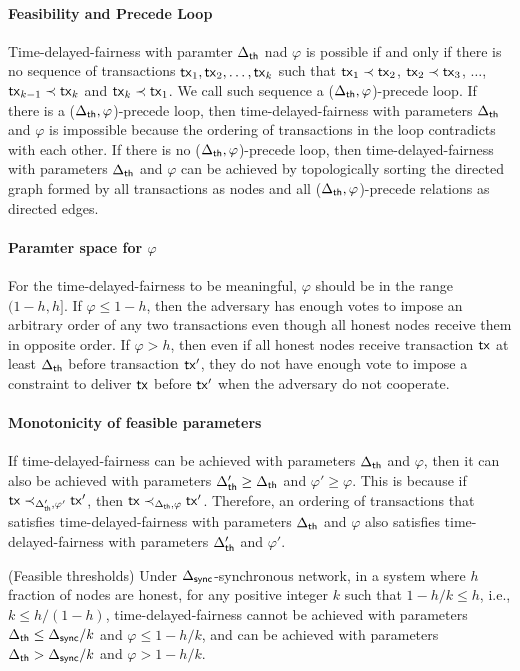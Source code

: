 \paragraph{Feasibility and Precede Loop} Time-delayed-fairness with paramter $\Delta_{\mathsf{th}}$ nad $\varphi$ is possible if and only if there is no sequence of transactions $\mathsf{tx}_1, \mathsf{tx}_2, \ldots, \mathsf{tx}_k$ such that $\mathsf{tx}_1\prec \mathsf{tx}_2$, $\mathsf{tx}_2\prec \mathsf{tx}_3$, $\ldots$, $\mathsf{tx}_{k-1}\prec \mathsf{tx}_k$ and $\mathsf{tx}_k\prec \mathsf{tx}_1$. We call such sequence a ($\Delta_{\mathsf{th}}, \varphi$)-precede loop. If there is a ($\Delta_{\mathsf{th}}, \varphi$)-precede loop, then time-delayed-fairness with parameters $\Delta_{\mathsf{th}}$ and $\varphi$ is impossible because the ordering of transactions in the loop contradicts with each other. If there is no ($\Delta_{\mathsf{th}}, \varphi$)-precede loop, then time-delayed-fairness with parameters $\Delta_{\mathsf{th}}$ and $\varphi$ can be achieved by topologically sorting the directed graph formed by all transactions as nodes and all ($\Delta_{\mathsf{th}}, \varphi$)-precede relations as directed edges. 

\paragraph{Paramter space for $\varphi$} For the time-delayed-fairness to be meaningful, $\varphi$ should be in the range $(1-h, h]$. If $\varphi\leq 1-h$, then the adversary has enough votes to impose an arbitrary order of any two transactions even though all honest nodes receive them in opposite order. If $\varphi>h$, then even if all honest nodes receive transaction $\mathsf{tx}$ at least $\Delta_{\mathsf{th}}$ before transaction $\mathsf{tx}'$, they do not have enough vote to impose a constraint to deliver $\mathsf{tx}$ before $\mathsf{tx}'$ when the adversary do not cooperate. 

\paragraph{Monotonicity of feasible parameters} If time-delayed-fairness can be achieved with parameters $\Delta_{\mathsf{th}}$ and $\varphi$, then it can also be achieved with parameters $\Delta_{\mathsf{th}}'\geq \Delta_{\mathsf{th}}$ and $\varphi'\geq \varphi$. This is because if $\mathsf{tx}\prec_{\Delta_{\mathsf{th}}', \varphi'} \mathsf{tx}'$, then $\mathsf{tx}\prec_{\Delta_{\mathsf{th}}, \varphi} \mathsf{tx}'$. Therefore, an ordering of transactions that satisfies time-delayed-fairness with parameters $\Delta_{\mathsf{th}}$ and $\varphi$ also satisfies time-delayed-fairness with parameters $\Delta_{\mathsf{th}}'$ and $\varphi'$. 

\begin{theorem}{(Feasible thresholds)}\label{thm:threshold}
    Under $\Delta_{\mathsf{sync}}$-synchronous network, in a system  where $h$ fraction of nodes are honest, for any positive integer $k$ such that $1-h/k\le h$, i.e., $k\le h/(1-h)$, time-delayed-fairness cannot be achieved with parameters $\Delta_{\mathsf{th}}\le\Delta_{\mathsf{sync}}/k$ and $\varphi \le 1-h/k$, and can be achieved with parameters $\Delta_{\mathsf{th}}>\Delta_{\mathsf{sync}}/k$ and $\varphi>1-h/k$.
\end{theorem}

